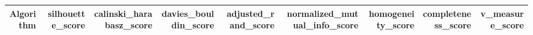 \begin{tabular}{rrrrrrrrr}
\toprule
Algorithm & silhouette_score & calinski_harabasz_score & davies_bouldin_score & adjusted_rand_score & normalized_mutual_info_score & homogeneity_score & completeness_score & v_measure_score \\
\midrule
\bottomrule
\end{tabular}
